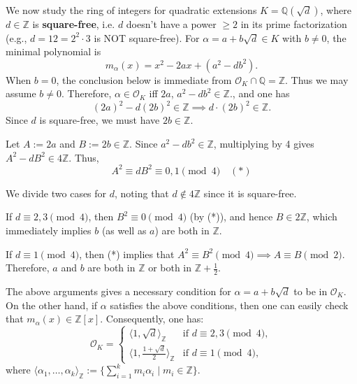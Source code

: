 \begin{example} \label{eg-quadraticok}
We now study the ring of integers for quadratic extensions $ K = \mathbb{Q}(\sqrt{d}) $, where $ d \in \mathbb{Z} $ is {\bf square-free}, i.e. $ d $ doesn't have a power $ \geq 2 $ in its prime factorization (e.g., $ d = 12 = 2^2 \cdot 3 $ is NOT square-free). For $\alpha=a+b\sqrt d\in K$ with $b\neq0$, the minimal polynomial is
$$
m_\alpha(x)=x^2-2ax+(a^2-db^2).
$$
When $b=0$, the conclusion below is immediate from $\mathcal O_K\cap\mathbb Q=\mathbb Z$. Thus we may assume $b\neq0$. Therefore,
$
\alpha \in \mathcal{O}_K$ iff $2a$, $a^2 - db^2 \in \mathbb{Z}.
$, and one has
$$
(2a)^2 - d(2b)^2 \in \mathbb{Z} \implies d \cdot (2b)^2 \in \mathbb{Z}.
$$
Since $ d $ is square-free, we must have $ 2b \in \mathbb{Z} $.  

Let $ A := 2a $ and $ B := 2b \in \mathbb{Z} $. Since $ a^2 - db^2 \in \mathbb{Z} $, multiplying by 4 gives $ A^2 - dB^2 \in 4\mathbb{Z} $. Thus,
$$
A^2 \equiv dB^2 \equiv 0, 1 \pmod{4} \quad (*)
$$

We divide two cases for $d$, noting that $d \notin 4\mathbb{Z}$ since it is square-free.

\smallskip
{} If $ d \equiv 2, 3 \pmod{4} $, then $B^2 \equiv 0 \pmod{4} $ (by (*)), and hence $B \in 2\mathbb{Z}$, which immediately implies $b$ (as well as $a$) are both in $\mathbb{Z}$.

\smallskip
{} If $ d \equiv 1 \pmod{4} $, then (*) implies that $ A^2 \equiv B^2 \pmod{4} \implies A \equiv B \pmod{2} $. Therefore, $ a $ and $ b $ are both in $ \mathbb{Z} $ or both in $ \mathbb{Z} + \frac{1}{2}$.

\smallskip
{} The above arguments gives a necessary condition for $\alpha = a+b\sqrt{d}$ to be in $\mathcal{O}_K$. On the other hand, if $\alpha$ satisfies the above conditions, then one can easily check that $m_{\alpha}(x) \in \mathbb{Z}[x]$. Consequently, one has:
$$
\mathcal{O}_K =
\begin{cases}
\langle 1, \sqrt{d} \rangle_{\mathbb{Z}} & \text{if } d \equiv 2, 3 \pmod{4}, \\
\langle 1, \frac{1+\sqrt{d}}{2} \rangle_{\mathbb{Z}} & \text{if } d \equiv 1 \pmod{4},
\end{cases}
$$
where $ \langle \alpha_1, \dots, \alpha_k \rangle_{\mathbb{Z}} := \{\sum_{i=1}^k m_i \alpha_i \mid m_i \in \mathbb{Z}\} $. %
\end{example}



